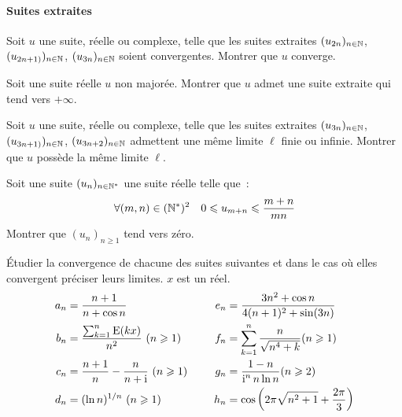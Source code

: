 \paragraph{Suites extraites}
\begin{exercice}
    Soit \(u\) une suite, réelle ou complexe, telle que les suites
    extraites \((u_{2n})_{n \in \mathbb{N}}\), \((u_{2n+1)})_{n \in \mathbb{N}}\),
    \((u_{3n})_{n \in \mathbb{N}}\) soient convergentes. Montrer que \(u\)
    converge.
\end{exercice}
\begin{exercice}
    Soit une suite réelle \(u\) non majorée. Montrer que \(u\) admet une
    suite extraite qui tend vers \(+\infty\).
\end{exercice}
\begin{exercice}
    Soit \(u\) une suite, réelle ou complexe, telle que les suites
    extraites \((u_{3n})_{n \in \mathbb{N}}\), \((u_{3n+1)})_{n \in \mathbb{N}}\),
    \((u_{3n+2})_{n \in \mathbb{N}}\) admettent une même limite \(\ell\) finie
    ou infinie. Montrer que \(u\) possède la même limite \(\ell\).
\end{exercice}
\begin{exercice}
    Soit une suite \((u_n)_{n \in \mathbb{N}^*}\) une suite réelle telle que~:
    \[\forall (m,n) \in (\mathbb{N}^*)^2 \quad 0 \leqslant u_{m+n} \leqslant
    \frac{m+n}{mn}\]
    Montrer que \((u_n)_{n\geqslant 1}\) tend vers zéro.
\end{exercice}
\begin{exercice}
    Étudier la convergence de chacune des suites suivantes et dans le
    cas où elles convergent préciser leurs limites. \(x\) est un réel.
    \begin{align*}
        a_n &= \frac{n+1}{n+\cos n} \qquad & e_n & = \frac{3n^2+\cos
        n}{4(n+1)^2+\sin(3n)} \\
        b_n &= \frac{\sum_{k = 1}^n \operatorname{E}(kx)}{n^2} \ (n \geqslant 1)
        \qquad & f_n &= \sum_{k = 1}^n \frac{n}{\sqrt{n^4+k}} (n
        \geqslant 1) \\
        c_n &= \frac{n+1}{n} - \frac{n}{n+\operatorname{i}} \ (n \geqslant 1) \quad &
        g_n &= \frac{1-n}{\operatorname{i}^n n \ln n} (n\geqslant 2) \\
        d_n &= (\ln n)^{1/n} \ (n \geqslant 1) \quad & h_n &=
        \cos\left(2\pi\sqrt{n^2+1}+\frac{2\pi}{3}\right)
    \end{align*}
\end{exercice}
